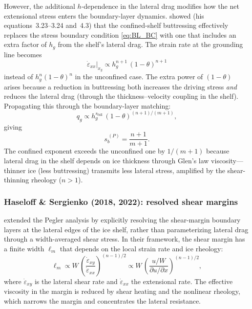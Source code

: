 \documentclass[11pt]{article}
\newcommand{\qg}{q_g}
\newcommand{\hg}{h_g}
\newcommand{\xg}{x_g}
\begin{document}
However, the additional $h$-dependence in the lateral drag modifies how the net extensional stress enters the boundary-layer dynamics.  \citet{Pegler2018} showed (his equations~3.23--3.24 and~4.3) that the confined-shelf buttressing effectively replaces the stress boundary condition \cref{eq:BL_BC} with one that includes an extra factor of $\hg$ from the shelf's lateral drag.  The strain rate at the grounding line becomes
\begin{equation}
	\dot{\varepsilon}_{xx}\big|_{\xg} \propto \hg^{n+1}\,(1-\theta)^{n+1}
	\label{eq:strain_rate_confined}
\end{equation}
instead of $\hg^n(1-\theta)^n$ in the unconfined case.  The extra power of $(1-\theta)$ arises because a reduction in buttressing both increases the driving stress \emph{and} reduces the lateral drag (through the thickness--velocity coupling in the shelf).  Propagating this through the boundary-layer matching:
\begin{equation}
	\qg \propto \hg^{s_{\mathrm{full}}}\,(1-\theta)^{(n+1)/(m+1)},
	\label{eq:pegler_flux}
\end{equation}
giving
\begin{equation}
	\boxed{s_b^{\,(P)} = \frac{n+1}{m+1}.}
	\label{eq:sb_pegler}
\end{equation}
The confined exponent exceeds the unconfined one by $1/(m+1)$ because lateral drag in the shelf depends on ice thickness through Glen's law viscosity---thinner ice (less buttressing) transmits less lateral stress, amplified by the shear-thinning rheology ($n > 1$).

\subsubsection{Haseloff \& Sergienko (2018, 2022): resolved shear margins}
\label{sec:sb_haseloff}

\citet{HaseloffSergienko2018} extended the Pegler analysis by explicitly resolving the shear-margin boundary layers at the lateral edges of the ice shelf, rather than parameterizing lateral drag through a width-averaged shear stress.  In their framework, the shear margin has a finite width $\ell_m$ that depends on the local strain rate and ice rheology:
\begin{equation}
	\ell_m \propto W\,\left(\frac{\dot{\varepsilon}_{xy}}{\dot{\varepsilon}_{xx}}\right)^{(n-1)/2}
	\propto W\,\left(\frac{u/W}{\partial u/\partial x}\right)^{(n-1)/2},
	\label{eq:margin_width}
\end{equation}
where $\dot{\varepsilon}_{xy}$ is the lateral shear rate and $\dot{\varepsilon}_{xx}$ the extensional rate.  The effective viscosity in the margin is reduced by shear heating and the nonlinear rheology, which narrows the margin and concentrates the lateral resistance.
\end{document}

